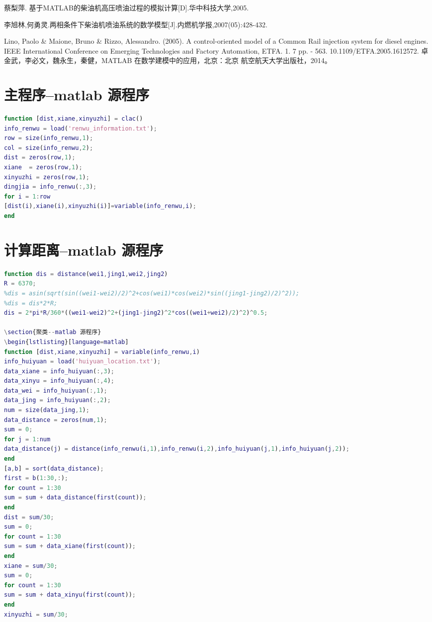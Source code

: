 \documentclass[withoutpreface,bwprint]{cumcmthesis} %
\begin{document}
\begin{thebibliography}{9}%
  蔡梨萍. 基于MATLAB的柴油机高压喷油过程的模拟计算[D].华中科技大学,2005.
 
 李旭林,何勇灵.两相条件下柴油机喷油系统的数学模型[J].内燃机学报,2007(05):428-432.
 
 Lino, Paolo \& Maione, Bruno \& Rizzo, Alessandro. (2005). A control-oriented model of a Common Rail injection system for diesel engines. IEEE International Conference on Emerging Technologies and Factory Automation, ETFA. 1. 7 pp. - 563. 10.1109/ETFA.2005.1612572. 
 卓金武，李必文，魏永生，秦健，MATLAB 在数学建模中的应用，北京：北京 航空航天大学出版社，2014。

\end{thebibliography}

\newpage
\appendix
\section{主程序--matlab 源程序}
\begin{lstlisting}[language=matlab]
function [dist,xiane,xinyuzhi] = clac()
info_renwu = load('renwu_information.txt');
row = size(info_renwu,1);
col = size(info_renwu,2);
dist = zeros(row,1);
xiane  = zeros(row,1);
xinyuzhi = zeros(row,1);
dingjia = info_renwu(:,3);
for i = 1:row
[dist(i),xiane(i),xinyuzhi(i)]=variable(info_renwu,i); 
end

 \end{lstlisting}

\section{计算距离--matlab 源程序}
\begin{lstlisting}[language=matlab]
function dis = distance(wei1,jing1,wei2,jing2)
R = 6370;
%dis = asin(sqrt(sin((wei1-wei2)/2)^2+cos(wei1)*cos(wei2)*sin((jing1-jing2)/2)^2));
%dis = dis*2*R;
dis = 2*pi*R/360*((wei1-wei2)^2+(jing1-jing2)^2*cos((wei1+wei2)/2)^2)^0.5;

\section{聚类--matlab 源程序}
\begin{lstlisting}[language=matlab]
function [dist,xiane,xinyuzhi] = variable(info_renwu,i)
info_huiyuan = load('huiyuan_location.txt');
data_xiane = info_huiyuan(:,3);
data_xinyu = info_huiyuan(:,4);
data_wei = info_huiyuan(:,1);
data_jing = info_huiyuan(:,2);
num = size(data_jing,1);
data_distance = zeros(num,1);
sum = 0;
for j = 1:num
data_distance(j) = distance(info_renwu(i,1),info_renwu(i,2),info_huiyuan(j,1),info_huiyuan(j,2));
end
[a,b] = sort(data_distance);
first = b(1:30,:);
for count = 1:30
sum = sum + data_distance(first(count));
end
dist = sum/30;
sum = 0;
for count = 1:30
sum = sum + data_xiane(first(count));
end
xiane = sum/30;
sum = 0;
for count = 1:30
sum = sum + data_xinyu(first(count));
end
xinyuzhi = sum/30;

\end{lstlisting}
\end{document}
